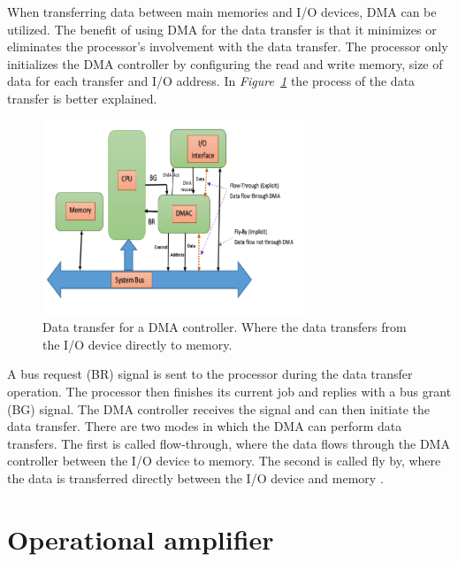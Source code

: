 When transferring data between main memories and I/O devices, DMA can be utilized.
The benefit of using DMA for the data transfer is that it minimizes or eliminates the processor's involvement with the data transfer.
The processor only initializes the DMA controller by configuring the read and write memory, size of data for each transfer and I/O address.
In \textit{Figure~\ref{fig:DMAcontroller}} the process of the data transfer is better explained.


\begin{figure}[h]
    \centering
    \includegraphics[width=0.70\textwidth]{graphics/DMA.png}
    \caption{Data transfer for a DMA controller. Where the data transfers from the I/O device directly to memory. \cite{ahmed_design_2019}}
    \label{fig:DMAcontroller}
\end{figure}

A bus request (BR) signal is sent to the processor during the data transfer operation.
The processor then finishes its current job and replies with a bus grant (BG) signal.
The DMA controller receives the signal and can then initiate the data transfer.
There are two modes in which the DMA can perform data transfers.
The first is called flow-through, where the data flows through the DMA controller between the I/O device to memory.
The second is called fly by, where the data is transferred directly between the I/O device and memory \cite{ahmed_design_2019}.



\section{Operational amplifier}

